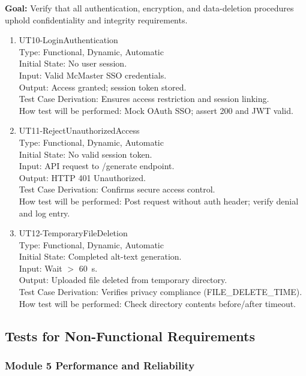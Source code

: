 \documentclass[12pt, titlepage]{article}
\begin{document}
\textbf{Goal:} Verify that all authentication, encryption, and
data-deletion procedures uphold confidentiality and integrity requirements.

\begin{enumerate}
\item{UT10-LoginAuthentication\\}
  Type: Functional, Dynamic, Automatic\\
  Initial State: No user session.\\
  Input: Valid McMaster SSO credentials.\\
  Output: Access granted; session token stored.\\
  Test Case Derivation: Ensures access restriction and session linking.\\
  How test will be performed: Mock OAuth SSO; assert 200 and JWT valid.

\item{UT11-RejectUnauthorizedAccess\\}
  Type: Functional, Dynamic, Automatic\\
  Initial State: No valid session token.\\
  Input: API request to /generate endpoint.\\
  Output: HTTP 401 Unauthorized.\\
  Test Case Derivation: Confirms secure access control.\\
  How test will be performed: Post request without auth header;
  verify denial and log entry.

\item{UT12-TemporaryFileDeletion\\}
  Type: Functional, Dynamic, Automatic\\
  Initial State: Completed alt-text generation.\\
  Input: Wait $>$ 60~s.\\
  Output: Uploaded file deleted from temporary directory.\\
  Test Case Derivation: Verifies privacy compliance (FILE\_DELETE\_TIME).\\
  How test will be performed: Check directory contents before/after timeout.
\end{enumerate}

\subsection{Tests for Non-Functional Requirements}

\subsubsection{Module 5 \textemdash{} Performance and Reliability}
\end{document}
